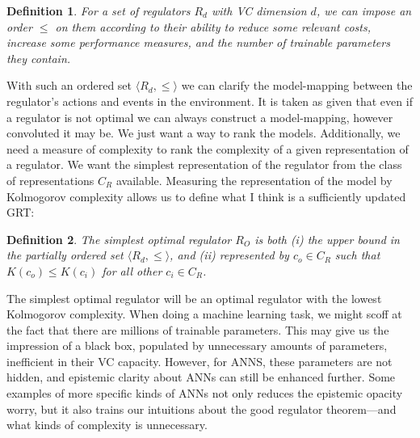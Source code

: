 \documentclass[11pt, oneside]{article}   	%
\newtheorem{theorem}{Definition}
\begin{document}
\begin{theorem}
For a set of regulators $R_d$ with VC dimension $d$, we can impose an order $\leq$ on them according to their ability to reduce some relevant costs, increase some performance measures, and the number of trainable parameters they contain.
\end{theorem}

With such an ordered set $\langle R_d,\leq \rangle$ we can clarify the model-mapping between the regulator's actions and events in the environment.  It is taken as given that even if a regulator is not optimal we can always construct a model-mapping, however convoluted it may be.  We just want a way to rank the models.  Additionally, we need a measure of complexity to rank the complexity of a given representation of a regulator.  We want the simplest representation of the regulator from the class of representations $C_R$ available.  Measuring the representation of the model by Kolmogorov complexity allows us to define what I think is a sufficiently updated GRT:

\begin{theorem}
The simplest optimal regulator $R_O$ is both (i) the upper bound in the partially ordered set $\langle R_d,\leq \rangle$, and (ii) represented by $c_o \in C_R$ such that $K(c_o)\leq K(c_i)$ for all other $c_i \in C_R$. 
\end{theorem}






The simplest optimal regulator will be an optimal regulator with the lowest Kolmogorov complexity.  When doing a machine learning task, we might scoff at the fact that there are millions of trainable parameters.  This may give us the impression of a black box, populated by unnecessary amounts of parameters, inefficient in their VC capacity.  However, for ANNS, these parameters are not hidden, and epistemic clarity about ANNs can still be enhanced further.  Some examples of more specific kinds of ANNs not only reduces the epistemic opacity worry, but it also trains our intuitions about the good regulator theorem---and what kinds of complexity is unnecessary.  
\end{document}
